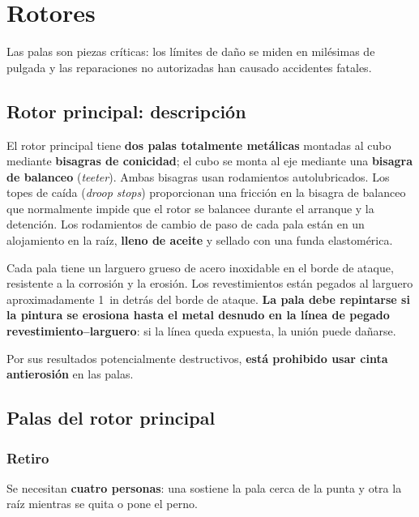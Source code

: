\chapter{Rotores}
\label{cap:mm-rotores}

\opening{Las palas son piezas críticas: los límites de daño se miden en milésimas de pulgada y las reparaciones no autorizadas han causado accidentes fatales.}

\section{Rotor principal: descripción}

El rotor principal tiene \textbf{dos palas totalmente metálicas} montadas al cubo mediante \textbf{bisagras de conicidad}; el cubo se monta al eje mediante una \textbf{bisagra de balanceo} (\emph{teeter}). Ambas bisagras usan rodamientos autolubricados. Los topes de caída (\emph{droop stops}) proporcionan una fricción en la bisagra de balanceo que normalmente impide que el rotor se balancee durante el arranque y la detención. Los rodamientos de cambio de paso de cada pala están en un alojamiento en la raíz, \textbf{lleno de aceite} y sellado con una funda elastomérica.

Cada pala tiene un larguero grueso de acero inoxidable en el borde de ataque, resistente a la corrosión y la erosión. Los revestimientos están pegados al larguero aproximadamente 1~in detrás del borde de ataque. \textbf{La pala debe repintarse si la pintura se erosiona hasta el metal desnudo en la línea de pegado revestimiento--larguero}: si la línea queda expuesta, la unión puede dañarse.

\begin{advertencia}
Por sus resultados potencialmente destructivos, \textbf{está prohibido usar cinta antierosión} en las palas.
\end{advertencia}

\section{Palas del rotor principal}

\subsection{Retiro}

Se necesitan \textbf{cuatro personas}: una sostiene la pala cerca de la punta y otra la raíz mientras se quita o pone el perno.

